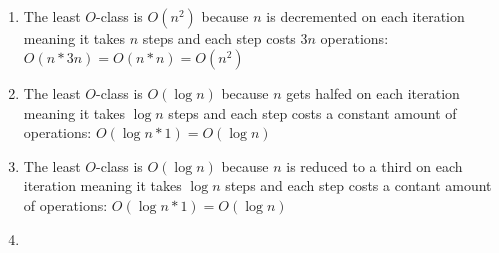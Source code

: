 \documentclass[12pt]{article}
\begin{document}
\subsection{} %
\begin{enumerate}[a]
	\item %
	The least $O$-class is $O(n^2)$ because $n$ is decremented on each iteration meaning it takes $n$ steps and each step costs $3n$ operations: $O(n * 3n) = O(n * n) = O(n^2)$

	\item %
	The least $O$-class is $O(\log n)$ because $n$ gets halfed on each iteration meaning it takes $\log n$ steps and each step costs a constant amount of operations: $O(\log n * 1) = O(\log n)$

	\item %
	The least $O$-class is $O(\log n)$ because $n$ is reduced to a third on each iteration meaning it takes $\log n$ steps and each step costs a contant amount of operations: $O(\log n * 1) = O(\log n)$

	\item %
\end{enumerate}

\subsection{} %


\subsection{} %

\end{document}
